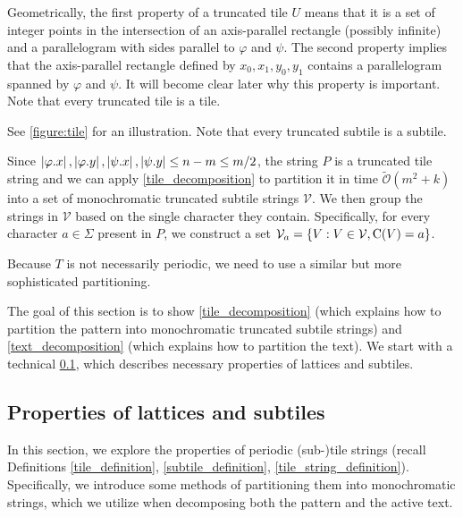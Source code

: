 \documentclass[twoside,leqno]{article}
\let\Cref\cref
\newcommand{\tO}{\tilde{\mathcal{O}}}
\newcommand{\V}{\mathcal{V}}
\renewcommand{\phi}{\varphi}
\newcommand{\set}[1]{\left\lbrace #1 \right\rbrace}
\newcommand{\absolute}[1]{\left\lvert#1\right\rvert}
\newcommand{\jonas}[2][]{\todo[color=green!40, #1]{\textbf{J:} #2}}
\newcommand{\jonasi}[2][]{\jonas[inline, #1]{#2}}
\begin{document}
\restateDefTruncatedTile

Geometrically, the first property of a truncated tile $U$ means that it is a set of integer points in the intersection of an axis-parallel rectangle (possibly infinite) and a parallelogram with sides parallel to $\phi$ and $\psi$. The second property implies that the axis-parallel rectangle defined by $x_0, x_1, y_0, y_1$ contains a parallelogram spanned by $\phi$ and $\psi$. It will become clear later why this property is important. Note that every truncated tile is a tile.

\restateDefSubtile

See \Cref{figure:tile} for an illustration. Note that every truncated subtile is a subtile.

\restateDefTileString

\restateDefMonochromaticString

\restateThmTileDecomposition

Since $\absolute{\x{\phi}}, \absolute{\y{\phi}}, \absolute{\x{\psi}}, \absolute{\y{\psi}} \le n - m \le m / 2$, the string $P$ is a truncated tile string and we can apply \Cref{tile_decomposition} to partition it in time $\tO(m^2 + k)$ into a set of monochromatic truncated subtile strings $\V$. We then group the strings in $\V$ based on the single character they contain. Specifically, for every character $a \in \Sigma$ present in $P$, we construct a set $\V_a = \set{V : V \in \V, \getchar{V} = a}$.

Because $T$ is not necessarily periodic, we need to use a similar but more sophisticated partitioning.

\restateDefActiveText

\restateObsActiveText

\restateDefPeripherality

\restateThmTextDecomposition

\jonasi{above}



The goal of this section is to show \cref{tile_decomposition} (which explains how to partition the pattern into monochromatic truncated subtile strings) and \cref{text_decomposition} (which explains how to partition the text). We start with a technical \cref{sec:lattices_subtiles}, which describes necessary properties of lattices and subtiles. 
 
\subsection{Properties of lattices and subtiles} \label{sec:lattices_subtiles}
In this section, we explore the properties of periodic (sub-)tile strings (recall Definitions \ref{tile_definition}, \ref{subtile_definition}, \ref{tile_string_definition}).
Specifically, we introduce some methods of partitioning them into monochromatic strings, which we utilize when decomposing both the pattern and the active text.
\end{document}

